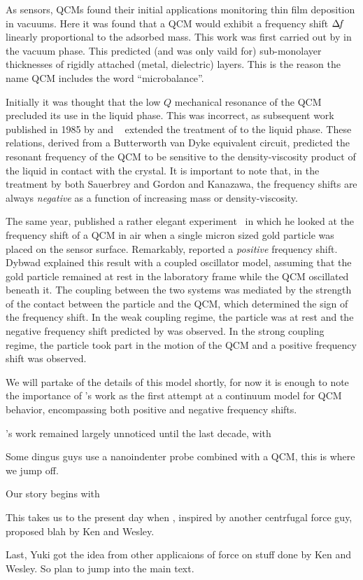 As sensors, QCMs found their initial applications monitoring thin film
deposition in vacuums.  Here it was found that a QCM would exhibit a
frequency shift $\Delta\!f$ linearly proportional to the adsorbed mass.  This
work was first carried out by  in the vacuum phase.  This
 predicted (and was only vaild for) sub-monolayer
thicknesses of rigidly attached (metal, dielectric) layers.  This is the
reason the name QCM includes the word ``microbalance''.

Initially it was thought that the low $Q$ mechanical resonance of the QCM
precluded its use in the liquid phase.  This was incorrect, as subsequent
work published in 1985 by  and
~\cite{kanazawa1985frequency} extended the treatment of
 to the liquid phase.  These relations, derived from a
Butterworth van Dyke equivalent circuit, predicted the resonant frequency
of the QCM to be sensitive to the density-viscosity product of the liquid
in contact with the crystal.  It is important to note that, in the
treatment by both Sauerbrey and Gordon and Kanazawa, the frequency shifts
are always \textit{negative} as a function of increasing mass or
density-viscosity.

The same year,  published a rather elegant
experiment~\cite{dybwad} in which he looked at the frequency shift of a QCM
in air when a single micron sized gold particle was placed on the sensor
surface.  Remarkably,  reported a \textit{positive} frequency
shift.  Dybwad explained this result with a coupled oscillator model,
assuming that the gold particle remained at rest in the laboratory frame
while the QCM oscillated beneath it.  The coupling between the two systems
was mediated by the strength of the contact between the particle and the
QCM, which determined the sign of the frequency shift.  In the weak
coupling regime, the particle was at rest and the negative frequency shift
predicted by  was observed.  In the strong coupling regime,
the particle took part in the motion of the QCM and a positive frequency
shift was observed.

We will partake of the details of this model shortly, for now it is enough
to note the importance of 's work as the first attempt at a
continuum model for QCM behavior, encompassing both positive and negative
frequency shifts.

's work remained largely unnoticed until the last decade, with 


Some dingus guys use a nanoindenter probe combined with a QCM, this is
where we jump off.

Our story begins with 

This takes us to the present day when , inspired by another
centrfugal force guy, proposed blah by Ken and Wesley.

Last, Yuki got the idea from other applicaions of force on stuff done by
Ken and Wesley.  So plan to jump into the main text.

